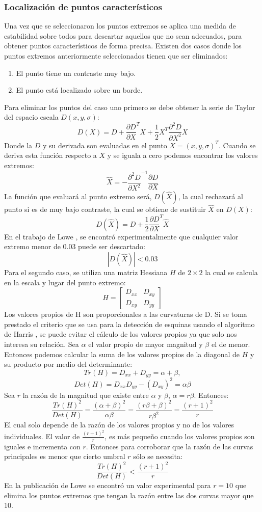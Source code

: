 \subsubsection{Localización de puntos característicos}
Una vez que se seleccionaron los puntos extremos se aplica una medida de estabilidad sobre todos para descartar aquellos que no sean adecuados, para obtener puntos  característicos de forma precisa. Existen dos casos donde los puntos extremos anteriormente seleccionados tienen que ser eliminados:
\begin{enumerate}
	\item El punto tiene un contraste muy bajo.
	\item El punto está localizado sobre un borde.
\end{enumerate}			
Para eliminar los puntos del caso uno primero se debe obtener la serie de Taylor del espacio escala $D(x,y,\sigma)$:
$$D(X)=D +\frac{\partial D}{\partial X}^T X+ \frac{1}{2} X^T\frac{\partial^2 D}{\partial X^2} X $$
Donde la $D$ y su derivada son evaluadas en el punto $X = (x,y,\sigma)^T$. Cuando se deriva esta función respecto a $X$ y se iguala a cero podemos encontrar los valores extremos: 
$$ \hat{X} = - \frac{\partial^2 D}{\partial X^2}^{-1}\frac{\partial D}{\partial X}$$
La función que evaluará al punto extremo será, $D(\hat{X})$, la cual rechazará al punto si es de muy bajo contraste, la cual se obtiene de sustituir $\hat{X}$ en $D(X)$:
$$D(\hat{X})=D + \frac{1}{2} \frac{\partial D}{\partial X}^T \hat{X} $$ 	 
En el trabajo de Lowe \cite{Lowe2004}, se encontró experimentalmente que cualquier valor extremo menor de 0.03 puede ser descartado:
$$ |D(\hat{X})|< 0.03$$ 	 
Para el segundo caso, se utiliza una matriz Hessiana $H$ de $2\times2$ la cual se calcula en la escala y lugar del punto extremo:
$$ 
H
=
\begin{bmatrix}
	D_{xx} & D_{xy}\\
	D_{xy} & D_{yy}
\end{bmatrix}		 	
$$	
Los valores propios de H son proporcionales a las curvaturas de D. Si se toma prestado el criterio que se usa para la detección de esquinas usando el algoritmo de Harris \cite{Harris1988}, se puede evitar el cálculo de los valores propios ya que solo nos interesa su relación. Sea $\alpha$ el valor propio de mayor magnitud y $\beta$ el de menor. Entonces podemos calcular la suma de los valores propios de la diagonal de $H$ y su producto por medio del determinante:
$$Tr(H) = D_{xx} + D_{yy} = \alpha+\beta,$$ $$Det(H) = D_{xx}D_{yy}-(D_{xy})^2= \alpha\beta$$
Sea $r$ la razón de la magnitud que existe entre $\alpha$ y $\beta$, $\alpha = r\beta$. Entonces:
$$\frac{Tr(H)^2}{Det(H)}= \frac{(\alpha+\beta)^2}{\alpha\beta}= \frac{(r\beta+\beta)^2}{r\beta^2}= \frac{(r+1)^2}{r}$$
El cual solo depende de la razón de los valores propios y no de los valores individuales. El valor de $\frac{(r+1)^2}{r}$, es más pequeño cuando los valores propios son iguales e incrementa con $r$. Entonces para corroborar que la razón de las curvas principales es menor que cierto umbral $r$ sólo se necesita:
$$\frac{Tr(H)^2}{Det(H)} < \frac{(r+1)^2}{r}$$
En la publicación de Lowe \cite{Lowe2004} se encontró un valor experimental para $r=10$ que elimina los puntos extremos que tengan la razón entre las dos curvas mayor que 10.
